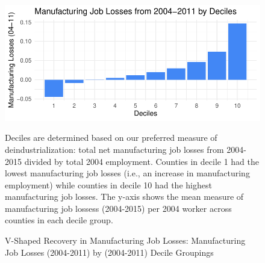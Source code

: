 \documentclass[]{AEA}
\begin{document}
\begin{figure} 
\caption{V-Shaped Recovery in Manufacturing Job Losses: Manufacturing Job Losses (2004-2011) by (2004-2011) Decile Groupings}
\label{fig:vShapePlot1}

\begin{center}\includegraphics{Final-Draft_files/figure-latex/unnamed-chunk-10-1} \end{center}



\FloatBarrier
\begin{figurenotes}
Deciles are determined based on our preferred measure of deindustrialization: total net manufacturing job losses from 2004-2015 divided by total 2004 employment. Counties in decile 1 had the lowest manufacturing job losses (i.e., an increase in manufacturing employment) while counties in decile 10 had the highest manufacturing job losses. The y-axis shows the mean measure of manufacturing job lossess (2004-2015) per 2004 worker across counties in each decile group.
\end{figurenotes}
\end{figure}
\end{document}
